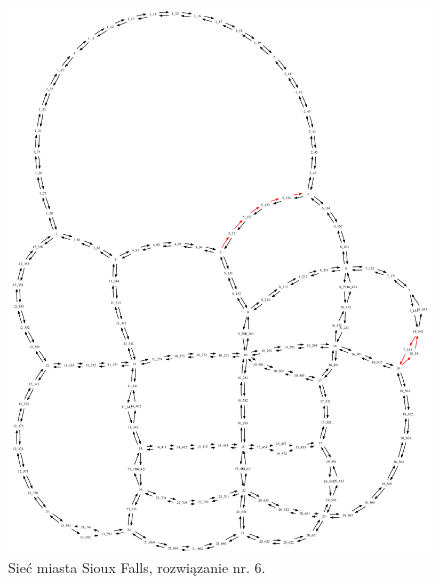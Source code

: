 \documentclass[twoside,12pt]{report}
\begin{document}
\begin{figure}[ht]
\centering
\includegraphics[totalheight=0.580\textheight, angle=90]{img/sioux-out/6/network2}
\caption{Sieć miasta Sioux Falls, rozwiązanie nr. 6.}
\label{sioux6}
\end{figure}
\end{document}
